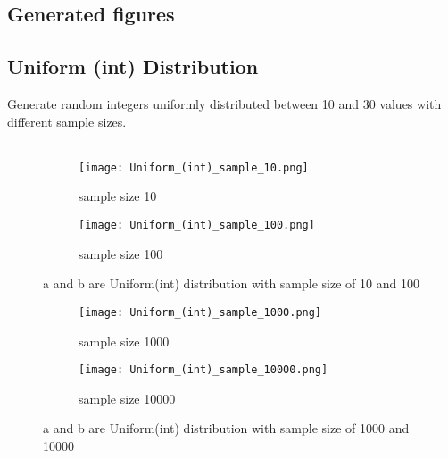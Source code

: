 \documentclass[12pt]{article}
\begin{document}
\subsection{Generated figures}

\subsection{Uniform (int) Distribution}
Generate random integers uniformly distributed between 10 and 30 values with different sample sizes.\\
\\

\begin{figure}[htb!]
    \centering
    \begin{subfigure}{0.45\textwidth}
        \centering
        \texttt{[image: Uniform\_(int)\_sample\_10.png]}
        \caption{sample size 10}
        \label{fig:sub1}
    \end{subfigure}
    \hfill
    \begin{subfigure}{0.45\textwidth}
        \centering
        \texttt{[image: Uniform\_(int)\_sample\_100.png]} 
        \caption{sample size 100}
        \label{fig:sub2}
    \end{subfigure}
    \caption{a and b are Uniform(int) distribution with sample size of 10 and 100}
    \label{fig:main}
\end{figure}

\begin{figure}[htb!]
    \centering
    \begin{subfigure}{0.45\textwidth}
        \centering
        \texttt{[image: Uniform\_(int)\_sample\_1000.png]}
        \caption{sample size 1000}
        \label{fig:sub1}
    \end{subfigure}
    \hfill
    \begin{subfigure}{0.45\textwidth}
        \centering
        \texttt{[image: Uniform\_(int)\_sample\_10000.png]} 
        \caption{sample size 10000}
        \label{fig:sub2}
    \end{subfigure}
    \caption{a and b are Uniform(int) distribution with sample size of 1000 and 10000}
    \label{fig:main}
\end{figure}
\end{document}
